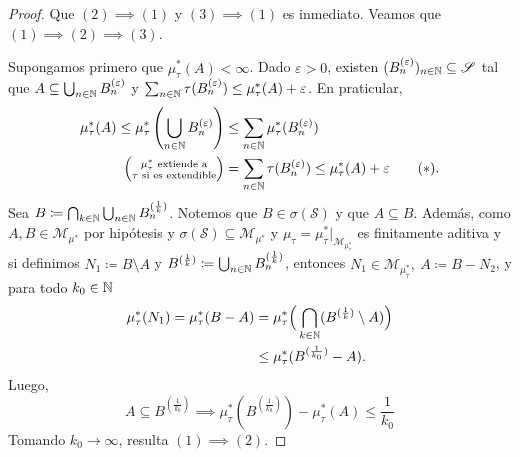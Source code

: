 \begin{proof}
	Que $(2) \implies (1)$ y $(3) \implies (1)$ es inmediato. Veamos que $(1) \implies (2) \implies (3)$. \par
	\medskip
	\noindent{} Supongamos primero que $\mu^{*}_{\tau}(A) < \infty$. Dado $\varepsilon > 0$, existen $(B^{(\varepsilon{})}_{n})_{n\in\mathbb{N}} \subseteq \mathscr{S}$ tal que $A \subseteq \bigcup_{n\in\mathbb{N}} B^{(\varepsilon{})}_{n}$ y $\sum_{n\in\mathbb{N}}\tau(B^{(\varepsilon)}_{n}) \leq \mu^{*}_{\tau}(A) + \varepsilon{}$. En praticular,
	\begin{align*}
		\mu^{*}_{\tau}(A) \leq \mu^{*}_{\tau}\left( \bigcup_{n\in\mathbb{N}} B^{(\varepsilon)}_{n} \right) & \leq \sum_{n\in\mathbb{N}} \mu^{*}_{\tau}(B^{(\varepsilon)}_{n}) \\
		\Big( \substack{\mu^{*}_{\tau} \text{ extiende a} \\
			\tau \text{ si es extendible}} \Big) &= \sum_{n\in\mathbb{N}} \tau(B^{(\varepsilon{})}_{n}) \leq \mu^{*}_{\tau}(A) + \varepsilon{} \tag{$*$}
	.\end{align*}
	Sea $B \coloneq \bigcap_{k\in\mathbb{N}} \bigcup_{n\in\mathbb{N}} B^{(\frac{1}{k})}_{n}$. Notemos que $B \in \sigma(\mathscr{S})$ y que $A \subseteq B$. Además, como $A,B \in \mathscr{M}_{\mu^{*}}$ por hipótesis y $\sigma(\mathscr{S}) \subseteq \mathscr{M}_{\mu^{*}}$ y $\mu_{\tau} = \mu^{*}_{\tau}\big|_{\mathscr{M}_{\mu^{*}_{\tau}}}$ es finitamente aditiva y si definimos $N_{1} \coloneq B \setminus A$ y $B^{(\frac{1}{k})} \coloneq \bigcup_{n\in\mathbb{N}}B^{(\frac{1}{k})}_{n}$, entonces $N_{1} \in \mathscr{M}_{\mu^{*}_{\tau}},\ A \coloneq B - N_{2}$, y para todo $k_{0} \in \mathbb{N}$
	\begin{align*}
		\mu^{*}_{\tau}(N_{1}) = \mu^{*}_{\tau}(B - A) &= \mu^{*}_{\tau} \Big( \bigcap_{k\in\mathbb{N}} (B^{(\frac{1}{k})} \setminus A) \Big) \\
		& \leq \mu^{*}_{\tau}(B^{(\frac{1}{k_{0}})}-A)
	.\end{align*}
	Luego,
	\[ A \subseteq B^{(\frac{1}{k_{0}})} \implies \mu^{*}_{\tau}(B^{(\frac{1}{k_{0}})}) - \mu^{*}_{\tau}(A) \leq \frac{1}{k_{0}} \tag{$*$} \]
	Tomando $k_{0} \longrightarrow{} \infty$, resulta $(1) \implies (2)$.
\end{proof}

